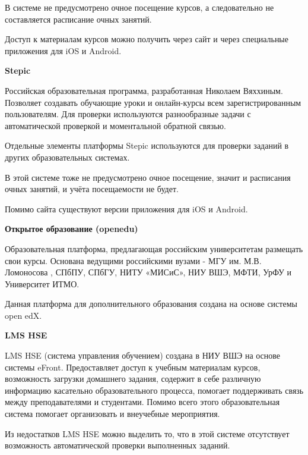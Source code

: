 \documentclass[a4paper,14pt]{article}
\begin{document}
В системе не предусмотрено очное посещение курсов, а следовательно не составляется расписание очных занятий.

Доступ к материалам курсов можно получить через сайт и через специальные приложения для iOS и Android.

\textbf{Stepic}

Российская образовательная программа, разработанная Николаем Вяххиным. Позволяет создавать обучающие уроки и онлайн-курсы всем зарегистрированным пользователям. Для проверки используются разнообразные задачи с автоматической проверкой и моментальной обратной связью.

Отдельные элементы платформы Stepic используются для проверки заданий в других образовательных системах.

В этой системе тоже не предусмотрено очное посещение, значит и расписания очных занятий, и учёта посещаемости не будет.

Помимо сайта существуют версии приложения для iOS и Android.

\textbf{Открытое образование (openedu)}

Образовательная платформа, предлагающая российским университетам размещать свои курсы. Основана ведущими российскими вузами - МГУ им. М.В. Ломоносова , СПбПУ, СПбГУ, НИТУ «МИСиС», НИУ ВШЭ, МФТИ, УрФУ и Университет ИТМО.

Данная платформа для дополнительного образования создана на основе системы open edX.

\textbf{LMS HSE}

LMS HSE (система управления обучением) создана в НИУ ВШЭ на основе системы eFront. Предоставляет доступ к учебным материалам курсов, возможность загрузки домашнего задания, содержит в себе различную информацию касательно образовательного процесса, помогает поддерживать связь между преподавателями и студентами.
Помимо всего этого образовательная система помогает организовать и внеучебные мероприятия. 

Из недостатков LMS HSE можно выделить то, что в этой системе отсутствует возможность автоматической проверки выполненных заданий.




\end{document}
